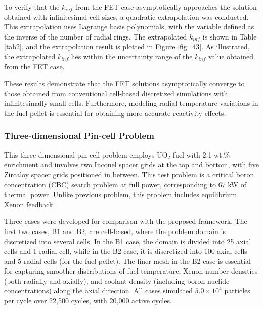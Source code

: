 To verify that the $k_{inf}$ from the FET case asymptotically approaches the solution obtained with infinitesimal cell sizes, a quadratic extrapolation was conducted. This extrapolation uses Lagrange basis polynomials, with the variable defined as the inverse of the number of radial rings. The extrapolated $k_{inf}$ is shown in Table \ref{tab2}, and the extrapolation result is plotted in Figure \ref{fig_43}. As illustrated, the extrapolated $k_{inf}$ lies within the uncertainty range of the $k_{inf}$ value obtained from the FET case.

These results demonstrate that the FET solutions asymptotically converge to those obtained from conventional cell-based discretized simulations with infinitesimally small cells. Furthermore, modeling radial temperature variations in the fuel pellet is essential for obtaining more accurate reactivity effects.

\subsubsection{Three-dimensional Pin-cell Problem}

This three-dimensional pin-cell problem employs UO$_2$ fuel with 2.1 wt.\% enrichment and involves two Inconel spacer grids at the top and bottom, with five Zircaloy spacer grids positioned in between. This test problem is a critical boron concentration (CBC) search problem at full power, corresponding to 67 kW of thermal power. Unlike previous problem, this problem includes equilibrium Xenon feedback.

Three cases were developed for comparison with the proposed framework. The first two cases, B1 and B2, are cell-based, where the problem domain is discretized into several cells. In the B1 case, the domain is divided into 25 axial cells and 1 radial cell, while in the B2 case, it is discretized into 100 axial cells and 5 radial cells (for the fuel pellet). The finer mesh in the B2 case is essential for capturing smoother distributions of fuel temperature, Xenon number densities (both radially and axially), and coolant density (including boron nuclide concentrations) along the axial direction. All cases simulated $5.0\times10^4$ particles per cycle over 22,500 cycles, with 20,000 active cycles.

